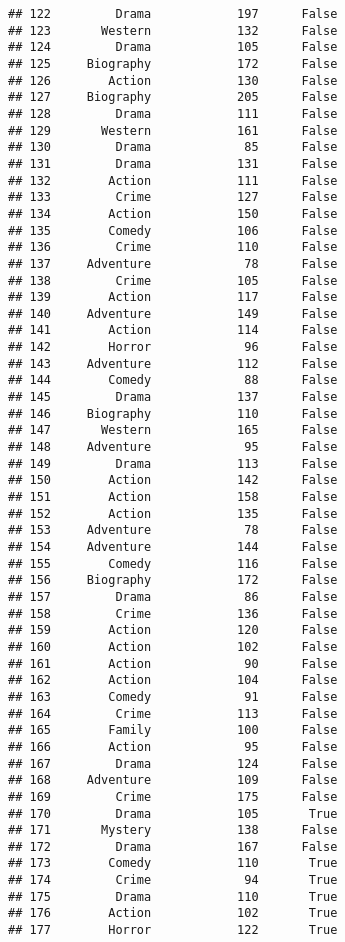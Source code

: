 \documentclass[
]{article}
\begin{document}
\begin{verbatim}
## 122         Drama            197      False
## 123       Western            132      False
## 124         Drama            105      False
## 125     Biography            172      False
## 126        Action            130      False
## 127     Biography            205      False
## 128         Drama            111      False
## 129       Western            161      False
## 130         Drama             85      False
## 131         Drama            131      False
## 132        Action            111      False
## 133         Crime            127      False
## 134        Action            150      False
## 135        Comedy            106      False
## 136         Crime            110      False
## 137     Adventure             78      False
## 138         Crime            105      False
## 139        Action            117      False
## 140     Adventure            149      False
## 141        Action            114      False
## 142        Horror             96      False
## 143     Adventure            112      False
## 144        Comedy             88      False
## 145         Drama            137      False
## 146     Biography            110      False
## 147       Western            165      False
## 148     Adventure             95      False
## 149         Drama            113      False
## 150        Action            142      False
## 151        Action            158      False
## 152        Action            135      False
## 153     Adventure             78      False
## 154     Adventure            144      False
## 155        Comedy            116      False
## 156     Biography            172      False
## 157         Drama             86      False
## 158         Crime            136      False
## 159        Action            120      False
## 160        Action            102      False
## 161        Action             90      False
## 162        Action            104      False
## 163        Comedy             91      False
## 164         Crime            113      False
## 165        Family            100      False
## 166        Action             95      False
## 167         Drama            124      False
## 168     Adventure            109      False
## 169         Crime            175      False
## 170         Drama            105       True
## 171       Mystery            138      False
## 172         Drama            167      False
## 173        Comedy            110       True
## 174         Crime             94       True
## 175         Drama            110       True
## 176        Action            102       True
## 177        Horror            122       True

\end{verbatim}
\end{document}
